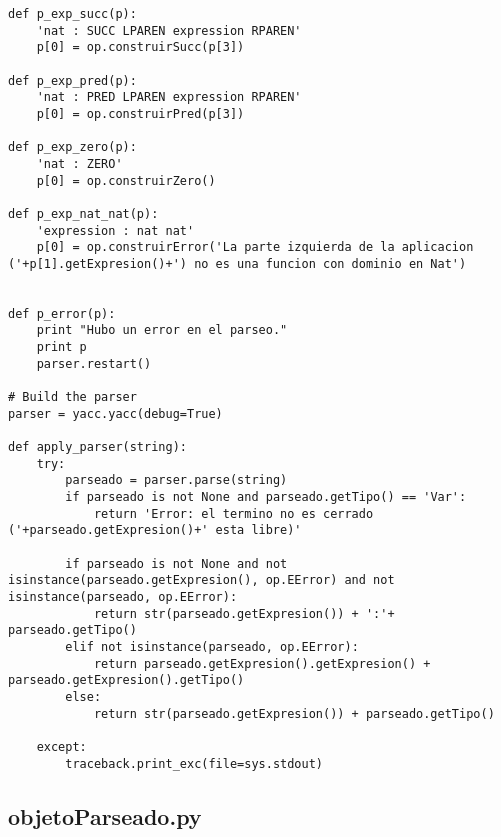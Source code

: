 \begin{verbatim}
def p_exp_succ(p):
    'nat : SUCC LPAREN expression RPAREN'    
    p[0] = op.construirSucc(p[3])

def p_exp_pred(p):
    'nat : PRED LPAREN expression RPAREN'
    p[0] = op.construirPred(p[3])

def p_exp_zero(p):
    'nat : ZERO'
    p[0] = op.construirZero()

def p_exp_nat_nat(p):
    'expression : nat nat'
    p[0] = op.construirError('La parte izquierda de la aplicacion ('+p[1].getExpresion()+') no es una funcion con dominio en Nat')
    
    
def p_error(p):
    print "Hubo un error en el parseo."
    print p
    parser.restart()

# Build the parser
parser = yacc.yacc(debug=True)

def apply_parser(string):
    try:
        parseado = parser.parse(string)
        if parseado is not None and parseado.getTipo() == 'Var':
            return 'Error: el termino no es cerrado ('+parseado.getExpresion()+' esta libre)'

        if parseado is not None and not isinstance(parseado.getExpresion(), op.EError) and not isinstance(parseado, op.EError):            
            return str(parseado.getExpresion()) + ':'+ parseado.getTipo()
        elif not isinstance(parseado, op.EError):
            return parseado.getExpresion().getExpresion() + parseado.getExpresion().getTipo()
        else:
            return str(parseado.getExpresion()) + parseado.getTipo()

    except:  
        traceback.print_exc(file=sys.stdout)

\end{verbatim}

\subsection{objetoParseado.py}

